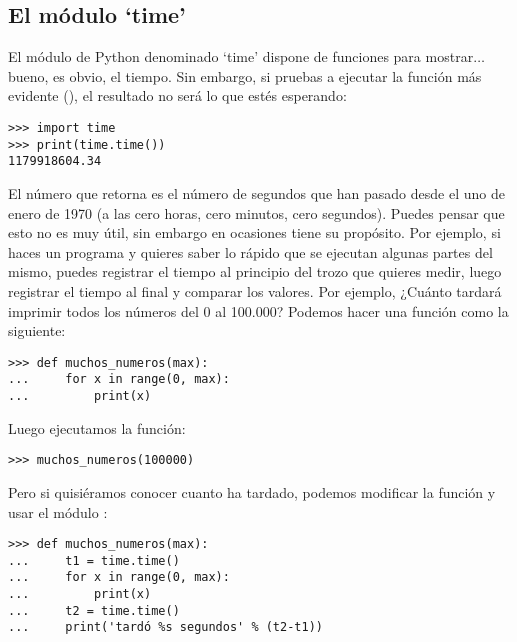 \subsection*{El módulo `time'}

El módulo de Python denominado `time' dispone de funciones para mostrar$\ldots$ bueno, es obvio, el tiempo.   Sin embargo, si pruebas a ejecutar la función más evidente (), el resultado no será lo que estés esperando:

\begin{listingignore}
\begin{verbatim}
>>> import time
>>> print(time.time())
1179918604.34
\end{verbatim}
\end{listingignore}

El número que retorna  es el número de segundos que han pasado desde el uno de enero de 1970 (a las cero horas, cero minutos, cero segundos).   Puedes pensar que esto no es muy útil, sin embargo en ocasiones tiene su propósito.  Por ejemplo, si haces un programa y quieres saber lo rápido que se ejecutan algunas partes del mismo, puedes registrar el tiempo al principio del trozo que quieres medir, luego registrar el tiempo al final y comparar los valores.   Por ejemplo, ¿Cuánto tardará imprimir todos los números del 0 al 100.000?   Podemos hacer una función como la siguiente:

\begin{listing}
\begin{verbatim}
>>> def muchos_numeros(max):
...     for x in range(0, max):
...         print(x)
\end{verbatim}
\end{listing}

\noindent
Luego ejecutamos la función:

\begin{listing}
\begin{verbatim}
>>> muchos_numeros(100000)
\end{verbatim}
\end{listing}

\noindent
Pero si quisiéramos conocer cuanto ha tardado, podemos modificar la función y usar el módulo :

\begin{listing}
\begin{verbatim}
>>> def muchos_numeros(max):
...     t1 = time.time()
...     for x in range(0, max):
...         print(x)
...     t2 = time.time()
...     print('tardó %s segundos' % (t2-t1))
\end{verbatim}
\end{listing}

